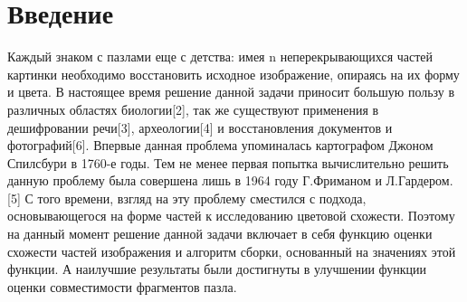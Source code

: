 \chapter*{Введение} %

Каждый знаком с пазлами еще с детства: имея n неперекрывающихся частей картинки необходимо восстановить исходное изображение, опираясь на их форму и цвета. В настоящее время решение данной задачи приносит большую пользу в различных областях биологии[2], так же существуют применения в дешифровании речи[3], археологии[4] и восстановления документов и фотографий[6]. Впервые данная проблема упоминалась картографом Джоном Спилсбури в 1760-е годы. Тем не менее первая попытка вычислительно решить данную проблему была совершена лишь в 1964 году Г.Фриманом и Л.Гардером. [5] С того времени, взгляд на эту проблему сместился с подхода, основывающегося на форме частей к исследованию цветовой схожести. Поэтому на данный момент решение данной задачи включает  в себя функцию оценки схожести частей изображения и алгоритм сборки, основанный на значениях этой функции. А наилучшие результаты были достигнуты в улучшении функции оценки совместимости фрагментов пазла.